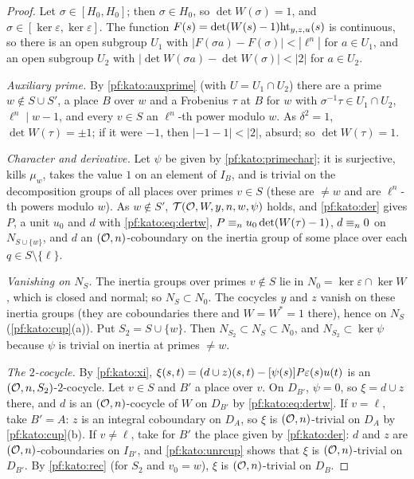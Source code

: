 \begin{proof}
Let $\sigma\in[H_0,H_0]$; then $\sigma\in H_0$, so $\det W(\sigma)=1$, and $\sigma\in[\ker\varepsilon,\ker\varepsilon]$. The function
$F(s)=\det(W(s)-1)\mathrm{ht}_{y,z,u}(s)$ is continuous, so there is an open subgroup $U_1$ with $|F(\sigma a)-F(\sigma)|<|\ell^n|$ for
$a\in U_1$, and an open subgroup $U_2$ with $|\det W(\sigma a)-\det W(\sigma)|<|2|$ for $a\in U_2$.

\emph{Auxiliary prime.} By \cref{pf:kato:auxprime} (with $U=U_1\cap U_2$) there are a prime $w\notin S\cup S'$, a place $B$ over
$w$ and a Frobenius $\tau$ at $B$ for $w$ with $\sigma^{-1}\tau\in U_1\cap U_2$, $\ell^n\mid w-1$, and every $v\in S$ an $\ell^n$-th power
modulo $w$. As $\delta^2=1$, $\det W(\tau)=\pm1$; if it were $-1$, then $|{-1}-1|<|2|$, absurd; so $\det W(\tau)=1$.

\emph{Character and derivative.} Let $\psi$ be given by \cref{pf:kato:primechar}; it is surjective, kills $\mu_w$, takes the value $1$
on an element of $I_B$, and is trivial on the decomposition groups of all places over primes $v\in S$ (these are $\ne w$ and are
$\ell^n$-th powers modulo $w$). As $w\notin S'$, $\mathcal{T}(\mathcal{O},W,y,n,w,\psi)$ holds, and \cref{pf:kato:der} gives $P$, a unit $u_0$
and $d$ with \eqref{pf:kato:eq:dertw}, $P\equiv_{n}u_0\det(W(\tau)-1)$, $d\equiv_{n}0$ on $N_{S\cup\{w\}}$, and $d$ an $(\mathcal{O},n)$-coboundary
on the inertia group of some place over each $q\in S\setminus\{\ell\}$.

\emph{Vanishing on $N_S$.} The inertia groups over primes $v\notin S$ lie in $N_0=\ker\varepsilon\cap\ker W$, which is closed and normal;
so $N_S\subset N_0$. The cocycles $y$ and $z$ vanish on these inertia groups (they are coboundaries there and $W=W^*=1$ there),
hence on $N_S$ (\cref{pf:kato:cup}(a)). Put $S_2=S\cup\{w\}$. Then $N_{S_2}\subset N_S\subset N_0$, and $N_{S_2}\subset\ker\psi$ because
$\psi$ is trivial on inertia at primes $\ne w$.

\emph{The $2$-cocycle.} By \cref{pf:kato:xi},
$\xi(s,t)=(d\cup z)(s,t)-[\psi(s)]P\varepsilon(s)u(t)$ is an $(\mathcal{O},n,S_2)$-$2$-cocycle. Let $v\in S$ and $B'$ a place over $v$.
On $D_{B'}$, $\psi=0$, so $\xi=d\cup z$ there, and $d$ is an $(\mathcal{O},n)$-cocycle of $W$ on $D_{B'}$ by \eqref{pf:kato:eq:dertw}. If
$v=\ell$, take $B'=A$: $z$ is an integral coboundary on $D_A$, so $\xi$ is $(\mathcal{O},n)$-trivial on $D_A$ by \cref{pf:kato:cup}(b). If
$v\ne\ell$, take for $B'$ the place given by \cref{pf:kato:der}: $d$ and $z$ are $(\mathcal{O},n)$-coboundaries on $I_{B'}$, and
\cref{pf:kato:unrcup} shows that $\xi$ is $(\mathcal{O},n)$-trivial on $D_{B'}$. By \cref{pf:kato:rec} (for $S_2$ and $v_0=w$), $\xi$ is
$(\mathcal{O},n)$-trivial on $D_B$.


\end{proof}
